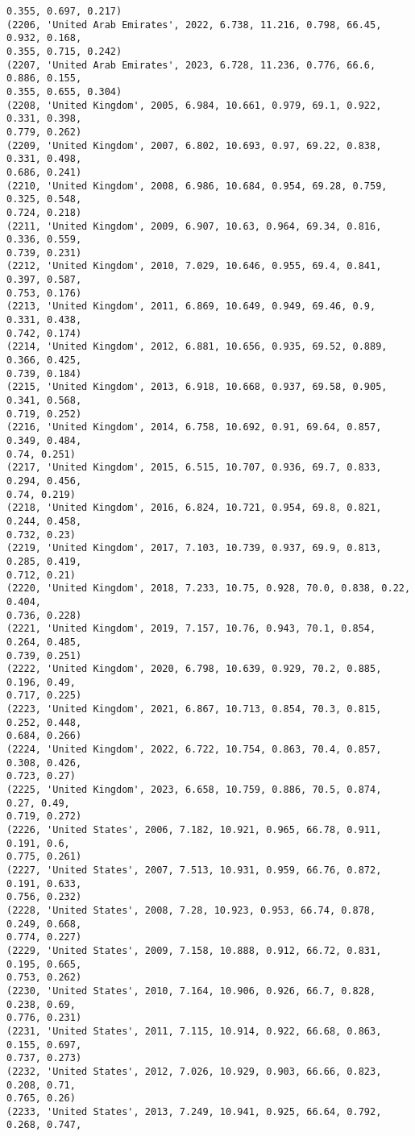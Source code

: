 \documentclass[11pt]{article}
\begin{document}
\begin{Verbatim}[commandchars=\\\{\}]
0.355, 0.697, 0.217)
(2206, 'United Arab Emirates', 2022, 6.738, 11.216, 0.798, 66.45, 0.932, 0.168,
0.355, 0.715, 0.242)
(2207, 'United Arab Emirates', 2023, 6.728, 11.236, 0.776, 66.6, 0.886, 0.155,
0.355, 0.655, 0.304)
(2208, 'United Kingdom', 2005, 6.984, 10.661, 0.979, 69.1, 0.922, 0.331, 0.398,
0.779, 0.262)
(2209, 'United Kingdom', 2007, 6.802, 10.693, 0.97, 69.22, 0.838, 0.331, 0.498,
0.686, 0.241)
(2210, 'United Kingdom', 2008, 6.986, 10.684, 0.954, 69.28, 0.759, 0.325, 0.548,
0.724, 0.218)
(2211, 'United Kingdom', 2009, 6.907, 10.63, 0.964, 69.34, 0.816, 0.336, 0.559,
0.739, 0.231)
(2212, 'United Kingdom', 2010, 7.029, 10.646, 0.955, 69.4, 0.841, 0.397, 0.587,
0.753, 0.176)
(2213, 'United Kingdom', 2011, 6.869, 10.649, 0.949, 69.46, 0.9, 0.331, 0.438,
0.742, 0.174)
(2214, 'United Kingdom', 2012, 6.881, 10.656, 0.935, 69.52, 0.889, 0.366, 0.425,
0.739, 0.184)
(2215, 'United Kingdom', 2013, 6.918, 10.668, 0.937, 69.58, 0.905, 0.341, 0.568,
0.719, 0.252)
(2216, 'United Kingdom', 2014, 6.758, 10.692, 0.91, 69.64, 0.857, 0.349, 0.484,
0.74, 0.251)
(2217, 'United Kingdom', 2015, 6.515, 10.707, 0.936, 69.7, 0.833, 0.294, 0.456,
0.74, 0.219)
(2218, 'United Kingdom', 2016, 6.824, 10.721, 0.954, 69.8, 0.821, 0.244, 0.458,
0.732, 0.23)
(2219, 'United Kingdom', 2017, 7.103, 10.739, 0.937, 69.9, 0.813, 0.285, 0.419,
0.712, 0.21)
(2220, 'United Kingdom', 2018, 7.233, 10.75, 0.928, 70.0, 0.838, 0.22, 0.404,
0.736, 0.228)
(2221, 'United Kingdom', 2019, 7.157, 10.76, 0.943, 70.1, 0.854, 0.264, 0.485,
0.739, 0.251)
(2222, 'United Kingdom', 2020, 6.798, 10.639, 0.929, 70.2, 0.885, 0.196, 0.49,
0.717, 0.225)
(2223, 'United Kingdom', 2021, 6.867, 10.713, 0.854, 70.3, 0.815, 0.252, 0.448,
0.684, 0.266)
(2224, 'United Kingdom', 2022, 6.722, 10.754, 0.863, 70.4, 0.857, 0.308, 0.426,
0.723, 0.27)
(2225, 'United Kingdom', 2023, 6.658, 10.759, 0.886, 70.5, 0.874, 0.27, 0.49,
0.719, 0.272)
(2226, 'United States', 2006, 7.182, 10.921, 0.965, 66.78, 0.911, 0.191, 0.6,
0.775, 0.261)
(2227, 'United States', 2007, 7.513, 10.931, 0.959, 66.76, 0.872, 0.191, 0.633,
0.756, 0.232)
(2228, 'United States', 2008, 7.28, 10.923, 0.953, 66.74, 0.878, 0.249, 0.668,
0.774, 0.227)
(2229, 'United States', 2009, 7.158, 10.888, 0.912, 66.72, 0.831, 0.195, 0.665,
0.753, 0.262)
(2230, 'United States', 2010, 7.164, 10.906, 0.926, 66.7, 0.828, 0.238, 0.69,
0.776, 0.231)
(2231, 'United States', 2011, 7.115, 10.914, 0.922, 66.68, 0.863, 0.155, 0.697,
0.737, 0.273)
(2232, 'United States', 2012, 7.026, 10.929, 0.903, 66.66, 0.823, 0.208, 0.71,
0.765, 0.26)
(2233, 'United States', 2013, 7.249, 10.941, 0.925, 66.64, 0.792, 0.268, 0.747,

\end{Verbatim}
\end{document}
